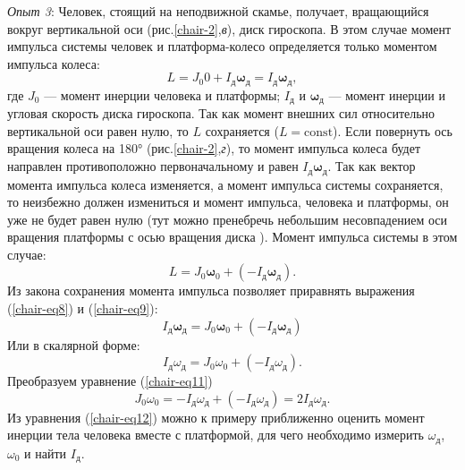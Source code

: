 \documentclass[14pt,a4paper,oneside]{extarticle}	%
\begin{document}
\textit{Опыт 3}:
Человек, стоящий на неподвижной скамье, получает, вращающийся вокруг вертикальной оси (рис.\ref{chair-2},\textit{в}), диск гироскопа. 
В этом случае момент импульса системы человек и платформа-колесо определяется только моментом импульса колеса:
\begin{equation}\label{chair-eq8}
L = J_{0}0 + I_{\text{д}}\bm{\omega}_{\text{д}} = I_{\text{д}}\bm{\omega}_{\text{д}},
\end{equation}
где $ J_{0} $ — момент инерции человека и платформы; $ I_{\text{д}} $ и $ \bm{\omega}_{\text{д}} $ — момент инерции и угловая скорость диска гироскопа.
Так как момент внешних сил относительно вертикальной оси равен нулю, то $ L $ сохраняется ($ L = \text{const} $).
Если повернуть ось вращения колеса на 180° (рис.\ref{chair-2},\textit{г}), то момент импульса колеса будет направлен противоположно первоначальному и равен $ I_{\text{д}}\bm{\omega}_{\text{д}} $.
Так как вектор момента импульса колеса изменяется, а момент импульса системы сохраняется, то неизбежно должен измениться и момент импульса, человека и платформы, он уже не будет равен нулю (тут можно пренебречь небольшим несовпадением оси вращения платформы с осью вращения диска ).
Момент импульса системы в этом случае:
\begin{equation}\label{chair-eq9}
L = J_{0}\bm{\omega}_{0} + (- I_{\text{д}}\bm{\omega}_{\text{д}}).
\end{equation}
Из закона сохранения момента импульса позволяет приравнять выражения (\ref{chair-eq8}) и (\ref{chair-eq9}):
\begin{equation}\label{chair-eq10}
I_{\text{д}}\bm{\omega}_{\text{д}} = J_{0}\bm{\omega}_{0} + (- I_{\text{д}}\bm{\omega}_{\text{д}})
\end{equation}
Или в скалярной форме:
\begin{equation}\label{chair-eq11}
I_{\text{д}}\omega_{\text{д}} = J_{0}\omega_{0} + (- I_{\text{д}}\omega_{\text{д}}).
\end{equation}
Преобразуем уравнение (\ref{chair-eq11})
\begin{equation}\label{chair-eq12}
J_{0}\omega_{0} =  -I_{\text{д}}\omega_{\text{д}} + (- I_{\text{д}}\omega_{\text{д}}) = 2I_{\text{д}}\omega_{\text{д}}.
\end{equation}
Из уравнения (\ref{chair-eq12}) можно к примеру приближенно оценить момент инерции тела человека вместе с платформой, для чего необходимо измерить $ \omega_{\text{д}} $, $ \omega_{0} $ и найти $ I_{\text{д}} $.
\end{document}
